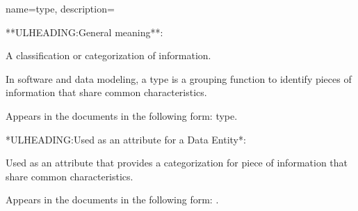 {
    name={type},
	description={
	**ULHEADING:General meaning**:

	A classification or categorization of information.

	In software and data modeling, a type is a grouping function to identify pieces of information that share common characteristics. 

	Appears in the documents in the following form: type.

	*ULHEADING:Used as an attribute for a \gls{Data Entity}*:

	Used as an attribute that provides a categorization for piece of information that share common characteristics.

	Appears in the documents in the following form: .
}
}
